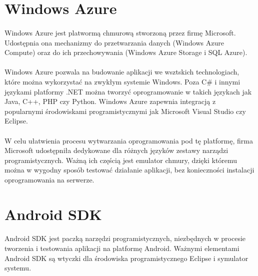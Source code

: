 \section{Windows Azure} %

\paragraph{} %
Windows Azure jest platwormą chmurową stworzoną przez firmę Microsoft. Udostępnia ona mechanizmy do przetwarzania danych (Windows Azure Compute) oraz do ich przechowywania (Windows Azure Storage  i SQL Azure).
\paragraph{} %
\label{par:}

Windows Azure pozwala na budowanie aplikacji we wsztskich technologiach, które można wykorzystać na zwykłym systemie Windows. Poza C\# i innymi językami platformy .NET można tworzyć oprogramowanie w takich językach jak Java, C++, PHP czy Python. Windows Azure zapewnia integracją z popularnymi środowiskami programistycznymi jak Microsoft Visual Studio czy Eclipse.
\paragraph{} %
\label{par:}

W celu ułatwienia procesu wytwarzania oprogramowania pod tę platformę, firma Microsoft udostępniła dedykowane dla różnych języków zestawy narządzi programistycznych. Ważną ich częścią jest emulator chmury, dzięki któremu można w wygodny sposób testować działanie aplikacji, bez konieczności instalacji oprogramowania na serwerze.

\section{Android SDK} %
\label{sec:android_sdk}

\paragraph{} %
\label{par:}

Android SDK jest paczką narzędzi programistycznych, niezbędnych w procesie tworzenia i testowania aplikacji na platformę Android. Ważnymi elementami Android SDK są wtyczki dla środowiska programistycznego Eclipse i symulator systemu.

